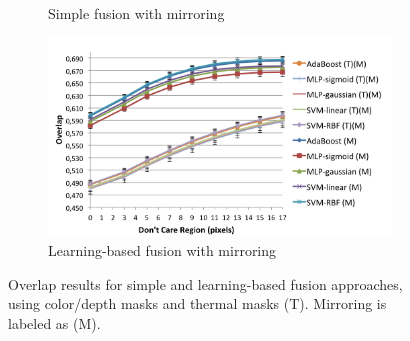 \documentclass[10pt,twocolumn,letterpaper]{article}
\begin{document}
\begin{figure}[htpb]
\begin{subfigure}[b]{1\columnwidth}
	\caption{Simple fusion with mirroring}%
	\label{}%
\end{subfigure}
\begin{subfigure}[b]{1\columnwidth}
	\includegraphics[width=\columnwidth]{learning_fusion_m.png}%
	\caption{Learning-based fusion with mirroring}%
	\label{}%
\end{subfigure}
\caption{Overlap results for simple and learning-based fusion approaches, using color/depth masks and thermal masks (T). Mirroring is labeled as (M).}
\label{fig:fusion_overlap}
\end{figure}
\end{document}
